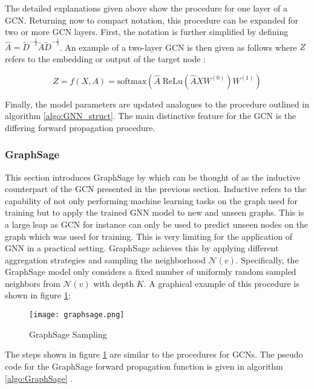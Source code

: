 	\noindent The detailed explanations given above show the procedure for
	one layer of a GCN. Returning now to compact notation, this procedure can be
	expanded for two or more GCN layers. First, the notation is further
	simplified by defining $\hat A = \tilde D^{-\frac{1}{2}}\tilde A \tilde
	D^{-\frac{1}{2}}$. An example of a two-layer GCN is then given as follows 
	where $Z$ refers to the embedding or output of the target node 
	\citep[p. 3]{kipf2016semi}:

	\begin{equation}
		Z = f(X,A) = \text{softmax}\left(\hat A \;\text{ReLu}\left(\hat A X
		W^{(0)}\right)W^{(1)}\right)
	\label{eq:GCN_forward}
	\end{equation}

	\noindent Finally, the model parameters are updated analogues to the
	procedure outlined in algorithm \ref{algo:GNN_struct}. The main distinctive
	feature for the GCN is the differing forward propagation procedure. 

	\subsubsection{GraphSage}
	
	\noindent This section introduces GraphSage by \cite{hamilton2017inductive} 
	which can be thought of as the inductive counterpart of the GCN presented 
	in the previous section. Inductive refers to the capability of not only 
	performing machine learning tasks on the graph used for training but to 
	apply the trained GNN model to new and unseen graphs. This is a large leap 
	as GCN for instance can only be used to predict unseen nodes on the graph 
	which was used for training. This is very limiting for the application of 
	GNN in a practical setting. GraphSage achieves this by applying different 
	aggregation strategies and sampling the neighborhood $\mathcal{N}(v)$.
	Specifically, the GraphSage model only considers a fixed number of 
	uniformly random sampled neighbors from $\mathcal{N}(v)$ with depth $K$. A 
	graphical example of this procedure is shown in figure \ref{fig:GraphSage_sample}:

	\begin{figure}[h]
		\centering
		\texttt{[image: graphsage.png]}
		\caption{GraphSage Sampling}
		\cite[p. 2]{hamilton2017inductive}
		\label{fig:GraphSage_sample}
	\end{figure}

	\noindent The steps shown in figure \ref{fig:GraphSage_sample} are similar
	to the procedures for GCNs. The pseudo code for the GraphSage forward 
	propagation function is given in algorithm \ref{algo:GraphSage} 
	\cite[p. 12]{hamilton2017inductive}. \\


